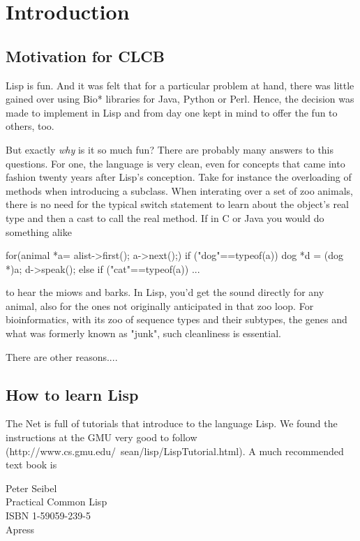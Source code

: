\documentclass{book}
\begin{document}
\chapter{Introduction}



\section{Motivation for CLCB}

Lisp is fun. And it was felt that for a particular problem at hand, 
there was little gained over using Bio* libraries for Java, Python or Perl.
Hence, the decision was made to implement in Lisp and from day one kept in
mind to offer the fun to others, too.

But exactly {\em why} is it so much fun? There are probably many answers
to this questions.  For one, the language is very clean, even for concepts
that came into fashion twenty years after Lisp's conception. Take
for instance the overloading of methods when introducing a subclass.
When interating over a set of zoo animals, there is no need for the
typical switch statement to learn about the object's real type and then a
cast to call the real method. If in C or Java you would do something alike

	for(animal *a= alist->first(); a->next();) {
		if ("dog"==typeof(a)) {
			dog *d = (dog *)a;
			d->speak();
		}
		else if ("cat"==typeof(a)) {
		...
		}
	}

to hear the miows and barks.  In Lisp, you'd get the sound directly for
any animal, also for the ones not originally anticipated in that zoo loop.
For bioinformatics, with its zoo of sequence types and their subtypes,
the genes and what was formerly known as "junk", such cleanliness is essential.

There are other reasons....

\section{How to learn Lisp}

The Net is full of tutorials that introduce to the language
Lisp. We found the instructions at the GMU very good to follow
(http://www.cs.gmu.edu/~sean/lisp/LispTutorial.html). A much recommended
text book is

	Peter Seibel\\
	Practical Common Lisp\\
	ISBN 1-59059-239-5\\
	Apress
\end{document}
